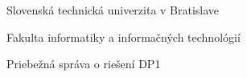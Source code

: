\begin{center}
\thispagestyle{empty}
{\Large Slovenská technická univerzita v Bratislave}
\par\end{center}{\Large \par}

\begin{center}
{\Large Fakulta informatiky a informačných technológií}
\par\end{center}{\Large \par}

\smallskip{}

\begin{center}

\myEvidenceNumber

\par\end{center}
\vfill{}

\begin{center}
\textbf{\Large \myName}
\par\end{center}{\Large \par}

\medskip{}


\begin{center}
\textbf{\LARGE \myTitle }
\par\end{center}{\huge \par}

\medskip{}


\begin{center}

{\Large Priebežná správa o riešení DP1}

\par\end{center}{\Large \par}

\vfill{}